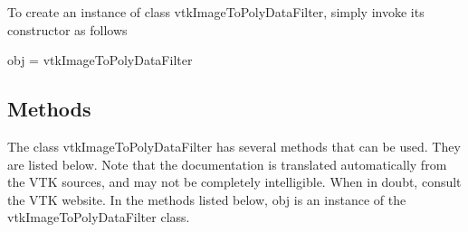 To create an instance of class vtk\-Image\-To\-Poly\-Data\-Filter, simply invoke its constructor as follows \begin{DoxyVerb}  obj = vtkImageToPolyDataFilter
\end{DoxyVerb}
 \hypertarget{vtkwidgets_vtkxyplotwidget_Methods}{}\subsection{Methods}\label{vtkwidgets_vtkxyplotwidget_Methods}
The class vtk\-Image\-To\-Poly\-Data\-Filter has several methods that can be used. They are listed below. Note that the documentation is translated automatically from the V\-T\-K sources, and may not be completely intelligible. When in doubt, consult the V\-T\-K website. In the methods listed below, {\ttfamily obj} is an instance of the vtk\-Image\-To\-Poly\-Data\-Filter class. 
